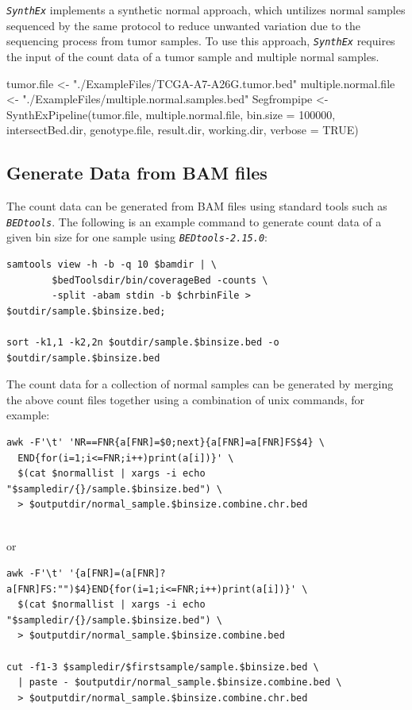\documentclass{article}
\newcommand{\pkg}[1]{\texttt{\textsl{#1}}}
\begin{document}
\pkg{SynthEx} implements a synthetic normal approach, which untilizes normal samples sequenced by the same protocol to reduce unwanted variation due to the sequencing process from tumor samples. To use this approach, \pkg{SynthEx} requires the input of the count data of a tumor sample and multiple normal samples.
\begin{Schunk}
\begin{Sinput}
 tumor.file <- "./ExampleFiles/TCGA-A7-A26G.tumor.bed"
 multiple.normal.file <- "./ExampleFiles/multiple.normal.samples.bed"
 Segfrompipe <- SynthExPipeline(tumor.file,
                                multiple.normal.file,
                                bin.size = 100000,
                                intersectBed.dir,
                                genotype.file,
                                result.dir, working.dir,
                                verbose = TRUE)
\end{Sinput}
\end{Schunk}


\subsection{Generate Data from BAM files}
The count data can be generated from BAM files using standard tools such as \pkg{BEDtools}. The following is an example command to generate count data of a given bin size for one sample using \pkg{BEDtools-2.15.0}:

\begin{lstlisting}
samtools view -h -b -q 10 $bamdir | \
        $bedToolsdir/bin/coverageBed -counts \
        -split -abam stdin -b $chrbinFile > $outdir/sample.$binsize.bed;

sort -k1,1 -k2,2n $outdir/sample.$binsize.bed -o $outdir/sample.$binsize.bed
\end{lstlisting}

The count data for a collection of normal samples can be generated by merging the above count files together using a combination of unix commands, for example:
\begin{lstlisting}
awk -F'\t' 'NR==FNR{a[FNR]=$0;next}{a[FNR]=a[FNR]FS$4} \
  END{for(i=1;i<=FNR;i++)print(a[i])}' \
  $(cat $normallist | xargs -i echo "$sampledir/{}/sample.$binsize.bed") \
  > $outputdir/normal_sample.$binsize.combine.chr.bed


\end{lstlisting}

or

\begin{lstlisting}
awk -F'\t' '{a[FNR]=(a[FNR]?a[FNR]FS:"")$4}END{for(i=1;i<=FNR;i++)print(a[i])}' \
  $(cat $normallist | xargs -i echo "$sampledir/{}/sample.$binsize.bed") \
  > $outputdir/normal_sample.$binsize.combine.bed

cut -f1-3 $sampledir/$firstsample/sample.$binsize.bed \
  | paste - $outputdir/normal_sample.$binsize.combine.bed \
  > $outputdir/normal_sample.$binsize.combine.chr.bed
\end{lstlisting}
\end{document}
